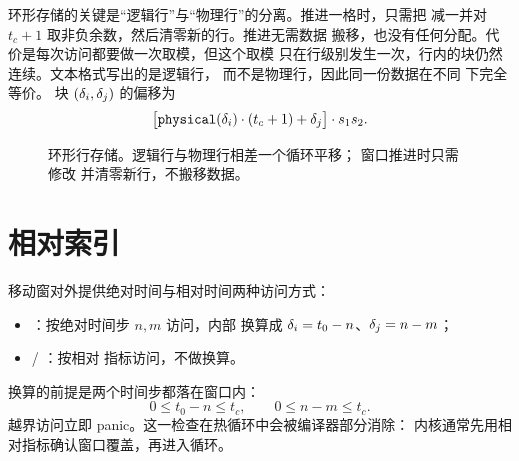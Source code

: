 环形存储的关键是“逻辑行”与“物理行”的分离。推进一格时，只需把
 减一并对 $t_c+1$ 取非负余数，然后清零新的行。推进无需数据
搬移，也没有任何分配。代价是每次访问都要做一次取模，但这个取模
只在行级别发生一次，行内的块仍然连续。文本格式写出的是逻辑行，
而不是物理行，因此同一份数据在不同  下完全等价。
块 $(\delta_i,\delta_j)$ 的偏移为
\begin{equation}
    \big[\code{physical}(\delti)\cdot(t_c+1)+\deltj\big]\cdot s_1 s_2 .
\end{equation}

\begin{figure}[htbp]
    \centering
    \caption[环形行存储]{环形行存储。逻辑行与物理行相差一个循环平移；
             窗口推进时只需修改  并清零新行，不搬移数据。}
    \label{fig:ring-buffer}
\end{figure}

\section{相对索引}
\label{sec:relative-index}

移动窗对外提供绝对时间与相对时间两种访问方式：
\begin{itemize}
    \item {}：按绝对时间步 $n,m$ 访问，内部
          换算成 $\delta_i = t_0-n$、$\delta_j = n-m$；
    \item {} / ：按相对
          指标访问，不做换算。
\end{itemize}
换算的前提是两个时间步都落在窗口内：
\begin{equation}
    0 \le t_0-n \le t_c,\qquad
    0 \le n-m \le t_c .
\end{equation}
越界访问立即 panic。这一检查在热循环中会被编译器部分消除：
内核通常先用相对指标确认窗口覆盖，再进入循环。

